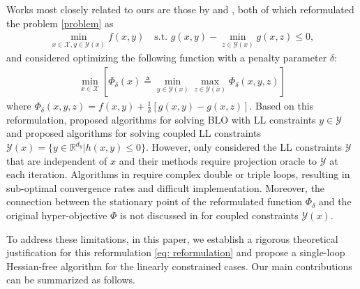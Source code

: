 \documentclass{article}
\newcommand{\Xc}{\mathcal{X}}
\newcommand{\Yc}{\mathcal{Y}}
\def\R{\mathbb{R}}
\newcommand{\st}{\text{s.t. }}
\theoremstyle{plain}
\theoremstyle{definition}
\theoremstyle{remark}
\begin{document}
Works most closely related to ours are those by \cite{kwon2023penalty} and \cite{jiang2024primal}, both of which reformulated the problem \eqref{problem} as
\begin{align}\label{problem signle}
    \min_{x\in\Xc, y\in\Yc(x)} f(x,y) \quad \st g(x,y)-\min_{z\in\Yc(x)}g(x,z)\leq 0,
\end{align}
and considered optimizing the following function with a penalty parameter $\delta$:
\begin{align}\label{eq: reformulation}
    \min_{x\in \Xc}[\Phi_\delta(x)\triangleq\min_{y\in\Yc(x)}\max_{z\in\Yc(x)}\Phi_\delta(x,y,z)]
\end{align}
where $\Phi_\delta(x,y,z)=f(x,y)+ \frac{1}{\delta}[g(x,y)-g(x,z)]$.
Based on this  reformulation, \cite{kwon2023penalty} proposed algorithms for solving BLO with LL constraints $y\in \Yc$  and \cite{jiang2024primal} proposed algorithms for solving coupled LL constraints $\Yc(x)=\{y\in \R^{d_y} | h(x,y)\leq 0\}$. However, \cite{kwon2023penalty} only considered the LL constraints $\Yc$ that are independent of $x$ and their methods require projection oracle to $\Yc$ at each iteration. Algorithms in \cite{jiang2024primal} require complex double or triple loops, resulting in sub-optimal convergence rates and difficult implementation. Moreover, the connection between the stationary point of the reformulated function $\Phi_\delta$
and the original hyper-objective $\Phi$ is not discussed in \citep{kwon2023penalty, jiang2024primal} for coupled constraints $\Yc(x)$. 

To address these limitations, in this paper, we establish a rigorous theoretical justification for this reformulation \eqref{eq: reformulation} and propose a single-loop Hessian-free algorithm for the linearly constrained cases.
Our main contributions can be summarized as follows.
\end{document}
